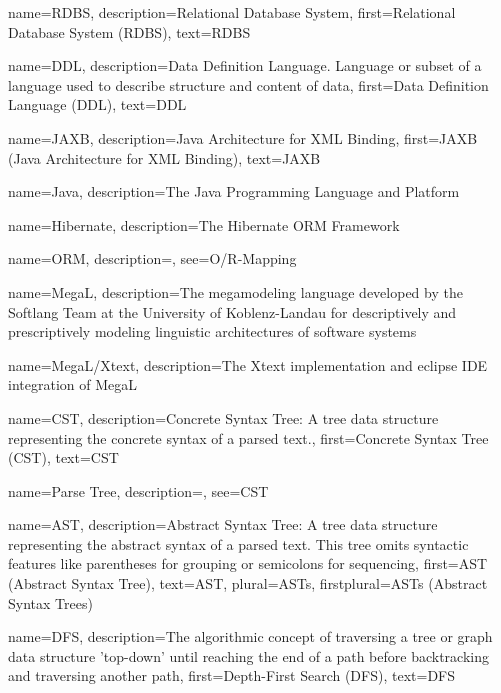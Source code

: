 {
    name=RDBS,
    description={Relational Database System},
    first={Relational Database System (RDBS)},
    text={RDBS}
}

{
    name=DDL,
    description={Data Definition Language. Language or subset of a language used to describe structure and content of data},
    first={Data Definition Language (DDL)},
    text={DDL}
}

{
    name=JAXB,
    description={Java Architecture for XML Binding},
    first={JAXB (Java Architecture for XML Binding)},
    text={JAXB}
}

{
    name=Java,
    description={The Java Programming Language and Platform}
}

{
    name=Hibernate,
    description={The Hibernate \gls{ORM} Framework}
}

{
    name=ORM,
    description={},
    see={O/R-Mapping}
}

{
    name=MegaL,
    description={The megamodeling language developed by the Softlang Team at the University of Koblenz-Landau for descriptively and prescriptively modeling linguistic architectures of software systems}
}

{
    name=MegaL/Xtext,
    description={The Xtext implementation and eclipse IDE integration of \gls{MegaL}}
}

{
    name=CST,
    description={Concrete Syntax Tree: A tree data structure representing the concrete syntax of a parsed text.},
    first={Concrete Syntax Tree (CST)},
    text={CST}
}

{
    name={Parse Tree},
    description={},
    see={CST}
}

{
    name=AST,
    description={Abstract Syntax Tree: A tree data structure representing the abstract syntax of a parsed text. This tree omits syntactic features like parentheses for grouping or semicolons for sequencing},
    first={AST (Abstract Syntax Tree)},
    text={AST},
    plural={ASTs},
    firstplural={ASTs (Abstract Syntax Trees)}
}

{
    name=DFS,
    description={The algorithmic concept of traversing a tree or graph data structure 'top-down' until reaching the end of a path before backtracking and traversing another path},
    first={Depth-First Search (DFS)},
    text={DFS}
}


